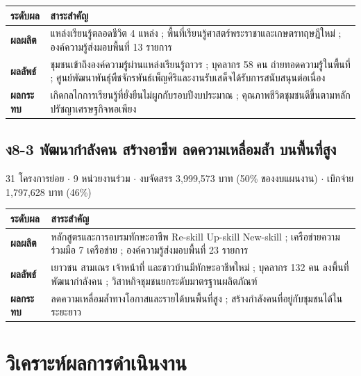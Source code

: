 \documentclass[12pt,a4paper]{article}
\begin{document}
\begin{center}\small
\setlength{\tabcolsep}{6pt}\renewcommand{\arraystretch}{1.3}
\begin{tabular}{p{2.5cm}p{12.2cm}}
\toprule
\rowcolor{rpfnavy!12}\textbf{ระดับผล} & \textbf{สาระสำคัญ}\\
\midrule
\textbf{ผลผลิต} & แหล่งเรียนรู้ตลอดชีวิต 4 แหล่ง ; พื้นที่เรียนรู้ศาสตร์พระราชาและเกษตรทฤษฎีใหม่ ; องค์ความรู้ส่งมอบพื้นที่ 13 รายการ\\
\textbf{ผลลัพธ์} & ชุมชนเข้าถึงองค์ความรู้ผ่านแหล่งเรียนรู้ถาวร ; บุคลากร 58 คน ถ่ายทอดความรู้ในพื้นที่ ; ศูนย์พัฒนาพันธุ์พืชจักรพันธ์เพ็ญศิริและงานรับเสด็จได้รับการสนับสนุนต่อเนื่อง\\
\textbf{ผลกระทบ} & เกิดกลไกการเรียนรู้ที่ยั่งยืนไม่ผูกกับรอบปีงบประมาณ ; คุณภาพชีวิตชุมชนดีขึ้นตามหลักปรัชญาเศรษฐกิจพอเพียง\\
\bottomrule
\end{tabular}
\end{center}

\subsection{ง8-3 พัฒนากำลังคน สร้างอาชีพ ลดความเหลื่อมล้ำ บนพื้นที่สูง}
31 โครงการย่อย $\cdot$ 9 หน่วยงานร่วม $\cdot$ งบจัดสรร 3,999,573 บาท (50\% ของงบแผนงาน) $\cdot$ เบิกจ่าย 1,797,628 บาท (46\%)

\begin{center}\small
\setlength{\tabcolsep}{6pt}\renewcommand{\arraystretch}{1.3}
\begin{tabular}{p{2.5cm}p{12.2cm}}
\toprule
\rowcolor{rpfnavy!12}\textbf{ระดับผล} & \textbf{สาระสำคัญ}\\
\midrule
\textbf{ผลผลิต} & หลักสูตรและการอบรมทักษะอาชีพ Re-skill Up-skill New-skill ; เครือข่ายความร่วมมือ 7 เครือข่าย ; องค์ความรู้ส่งมอบพื้นที่ 23 รายการ\\
\textbf{ผลลัพธ์} & เยาวชน สามเณร เจ้าหน้าที่ และชาวบ้านมีทักษะอาชีพใหม่ ; บุคลากร 132 คน ลงพื้นที่พัฒนากำลังคน ; วิสาหกิจชุมชนยกระดับมาตรฐานผลิตภัณฑ์\\
\textbf{ผลกระทบ} & ลดความเหลื่อมล้ำทางโอกาสและรายได้บนพื้นที่สูง ; สร้างกำลังคนที่อยู่กับชุมชนได้ในระยะยาว\\
\bottomrule
\end{tabular}
\end{center}

\clearpage
\section{วิเคราะห์ผลการดำเนินงาน}
\end{document}
